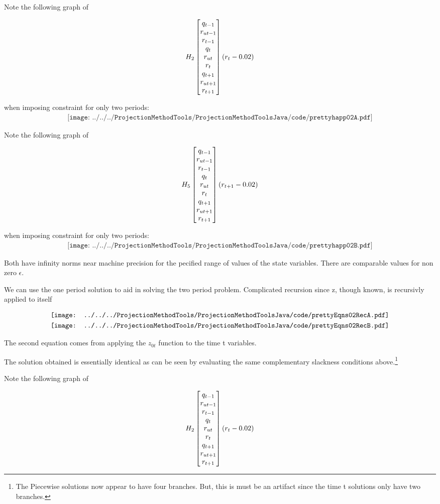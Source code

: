  Note the following graph of 

 \begin{gather*}
 H_{2}\begin{bmatrix} q_{t-1}\\r_{ut-1}\\r_{t-1}\\ q_{t}\\r_{ut}\\r_{t}\\ q_{t+1}\\r_{ut+1}\\r_{t+1} \end{bmatrix} ( r_t-0.02)
 \end{gather*}

  when imposing constraint for only two periods:
 \begin{gather*}
 \texttt{[image: ../../../ProjectionMethodTools/ProjectionMethodToolsJava/code/prettyhapp02A.pdf]}
 \end{gather*}


 Note the following graph of 

 \begin{gather*}
 H_{5}\begin{bmatrix} q_{t-1}\\r_{ut-1}\\r_{t-1}\\ q_{t}\\r_{ut}\\r_{t}\\ q_{t+1}\\r_{ut+1}\\r_{t+1} \end{bmatrix}( r_{t+1}-0.02)
 \end{gather*}

  when imposing constraint for only two periods:
 \begin{gather*}
 \texttt{[image: ../../../ProjectionMethodTools/ProjectionMethodToolsJava/code/prettyhapp02B.pdf]}
 \end{gather*}


Both have infinity norms near machine precision for the pecified range of values of the state variables.  There are comparable values for non zero $\epsilon$.


We can use the one period solution to aid in solving the two period problem.
Complicated recursion since z, though known, is recursivly applied to itself


\begin{gather*}
  \vcenter{\hbox{\texttt{[image: ../../../ProjectionMethodTools/ProjectionMethodToolsJava/code/prettyEqns02RecA.pdf]}}}\\
  \vcenter{\hbox{\texttt{[image: ../../../ProjectionMethodTools/ProjectionMethodToolsJava/code/prettyEqns02RecB.pdf]}}}\\
\end{gather*}

The second equation comes from applying the $z_{0t}$ function to the time t variables.


The solution obtained is essentially identical as can be seen by evaluating the
same complementary slackness conditions above.\footnote{The Piecewise solutions now appear to have four branches.  But, this
 is must be an artifact since the time t solutions only have two branches.}


 Note the following graph of 

 \begin{gather*}
 H_{2}\begin{bmatrix} q_{t-1}\\r_{ut-1}\\r_{t-1}\\ q_{t}\\r_{ut}\\r_{t}\\ q_{t+1}\\r_{ut+1}\\r_{t+1} \end{bmatrix} ( r_t-0.02)
 \end{gather*}

